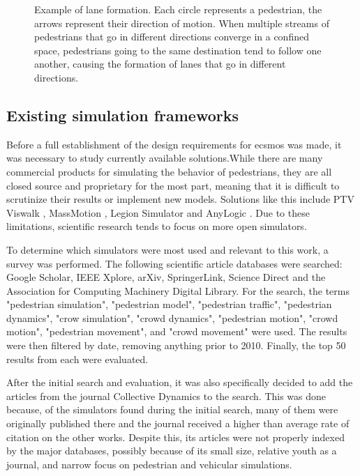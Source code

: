 \documentclass[twoside, 11pt]{article}
\begin{document}
\begin{figure}[!h]
  \centering
  
  \caption[Example of lane formation]{Example of lane formation. Each circle represents a pedestrian, the arrows represent their direction of motion. When multiple streams of pedestrians that go in different directions converge in a confined space, pedestrians going to the same destination tend to follow one another, causing the formation of lanes that go in different directions.}
  \label{fig:lane-formation}
\end{figure}

\subsection{Existing simulation frameworks} \label{sec:existing-frameworks}

Before a full establishment of the design requirements for \gls{ecsmos} was made, it was necessary to study currently available solutions.While there are many commercial products for simulating the behavior of pedestrians, they are all closed source and proprietary for the most part, meaning that it is difficult to scrutinize their results or implement new models. Solutions like this include PTV Viswalk \cite{viswalk}, MassMotion \cite{massmotion}, Legion Simulator \cite{legionsimulator} and AnyLogic \cite{anylogic}. Due to these limitations, scientific research tends to focus on more open simulators. 

To determine which simulators were most used and relevant to this work, a survey was performed. The following scientific article databases were searched: Google Scholar, IEEE Xplore, arXiv, SpringerLink, Science Direct and the Association for Computing Machinery Digital Library. For the search, the terms "pedestrian simulation", "pedestrian model", "pedestrian traffic", "pedestrian dynamics", "crow simulation", "crowd dynamics", "pedestrian motion", "crowd motion", "pedestrian movement", and "crowd movement" were used.
The results were then filtered by date, removing anything prior to 2010. Finally, the top 50 results from each were evaluated.

After the initial search and evaluation, it was also specifically decided to add the articles from the journal Collective Dynamics to the search. This was done because, of the simulators found during the initial search, many of them were originally published there and the journal received a higher than average rate of citation on the other works. Despite this, its articles were not properly indexed by the major databases, possibly because of its small size, relative youth as a journal, and narrow focus on pedestrian and vehicular simulations. 
\end{document}
